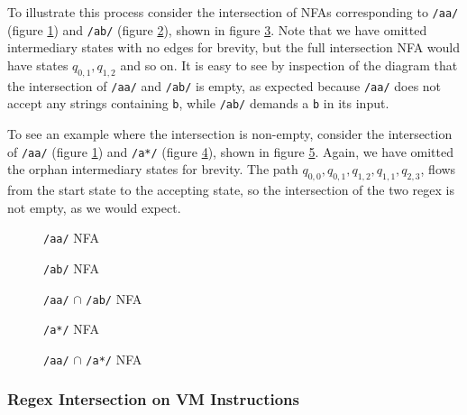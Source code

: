 To illustrate this process consider the intersection of NFAs corresponding
to \verb'/aa/' (figure \ref{fig:NFAaa}) and \verb'/ab/'
(figure \ref{fig:NFAab}), shown in figure \ref{fig:NFAaa:ab}. Note that
we have omitted intermediary states with no edges for brevity, but the
full intersection NFA would have states $q_{0,1}, q_{1,2}$ and so on.
It is easy to see by inspection of the diagram that the intersection of
\verb'/aa/' and \verb'/ab/' is empty, as expected because
\verb'/aa/' does not accept any strings containing \verb'b', while
\verb'/ab/' demands a \verb'b' in its input.

To see an example where the intersection is non-empty, consider the
intersection of \verb'/aa/' (figure \ref{fig:NFAaa}) and \verb'/a*/'
(figure \ref{fig:NFAastar}), shown in figure \ref{fig:NFAaa:astar}.
Again, we have omitted the orphan intermediary states for brevity.
The path $q_{0,0}, q_{0,1}, q_{1,2}, q_{1,1}, q_{2,3}$, flows from
the start state to the accepting state, so the intersection of the
two regex is not empty, as we would expect.

\begin{figure}
\centering
\caption{{\tt /aa/} NFA}
    
\label{fig:NFAaa}
\end{figure}

\begin{figure}
\centering
\caption{{\tt /ab/} NFA}
    
\label{fig:NFAab}
\end{figure}


\begin{figure}
\centering
\caption{{\tt /aa/} $\cap$ {\tt /ab/} NFA}
    
\label{fig:NFAaa:ab}
\end{figure}

\begin{figure}
\centering
\caption{{\tt /a*/} NFA}
    
\label{fig:NFAastar}
\end{figure}

\begin{figure}
\centering
\caption{{\tt /aa/} $\cap$ {\tt /a*/} NFA}
    
\label{fig:NFAaa:astar}
\end{figure}

\subsubsection{Regex Intersection on VM Instructions}

